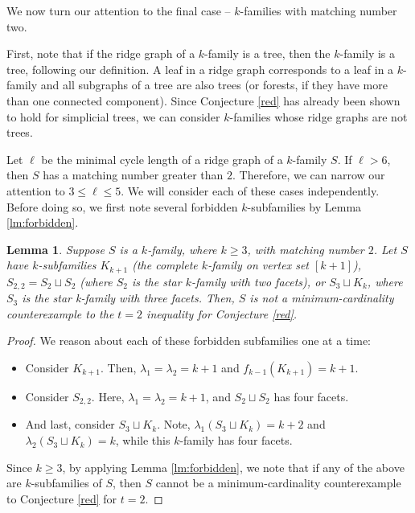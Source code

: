 \documentclass[11pt]{article}
\newtheorem{lm}{Lemma}
\begin{document}
We now turn our attention to the final case -- $k$-families with matching number two.

First, note that if the ridge graph of a $k$-family is a tree, then the $k$-family is a tree, following our definition.
A leaf in a ridge graph corresponds to a leaf in a $k$-family and all subgraphs of a tree are also trees (or forests, if they have more than one connected component). Since Conjecture \ref{red} has already been shown to hold for simplicial trees, we can consider $k$-families whose ridge graphs are not trees.

Let $\ell$ be the minimal cycle length of a ridge graph of a $k$-family $S$. If $\ell > 6$, then $S$ has a matching number greater than $2$. Therefore, we can narrow our attention to $3 \leq \ell \leq 5$. We will consider each of these cases independently. Before doing so, we first note several forbidden $k$-subfamilies by Lemma \ref{lm:forbidden}.



\begin{lm}
Suppose $S$ is a $k$-family, where $k \geq 3$, with matching number $2$. Let $S$ have $k$-subfamilies $K_{k+1}$ (the complete $k$-family on vertex set $[k+ 1]$), $S_{2, 2} = S_2 \sqcup S_2$ (where $S_2$ is the star $k$-family with two facets), or $S_{3} \sqcup K_k$, where $S_3$ is the star k-family with three facets. Then, $S$ is not a minimum-cardinality counterexample to the $t = 2$ inequality for Conjecture \ref{red}.
\end{lm}

\begin{proof}
We reason about each of these forbidden subfamilies one at a time:
\begin{itemize}
\item[Case 1:] Consider $K_{k+1}$. Then, $\lambda_1 = \lambda_2 = k + 1$ and $f_{k-1}(K_{k+1}) = k + 1$.
\item[Case 2:] Consider $S_{2, 2}$. Here, $\lambda_1 = \lambda_2 = k + 1$, and $S_2 \sqcup S_2$ has four facets.
\item[Case 3:] And last, consider $S_{3} \sqcup K_k$. Note, $\lambda_1(S_3 \sqcup K_k) = k + 2$ and $\lambda_2(S_3 \sqcup K_k) = k$, while this $k$-family has four facets.
\end{itemize}

\noindent Since $k \geq 3$, by applying Lemma \ref{lm:forbidden}, we note that if any of the above are $k$-subfamilies of $S$, then $S$ cannot be a minimum-cardinality counterexample to Conjecture \ref{red} for $t = 2$.
\end{proof}
\end{document}
